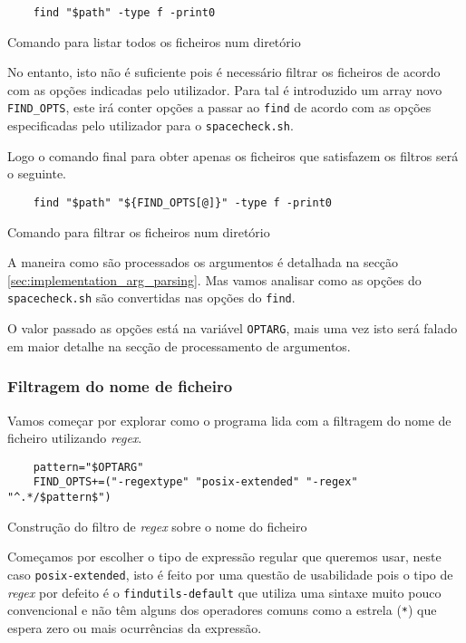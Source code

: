 \begin{listing}[H]
	\centering
	\begin{verbatim}
    find "$path" -type f -print0
  \end{verbatim}
	\caption{Comando para listar todos os ficheiros num diretório}
\end{listing}

No entanto, isto não é suficiente pois é necessário filtrar os ficheiros de
acordo com as opções indicadas pelo utilizador. Para tal é introduzido um array
novo \Verb|FIND_OPTS|, este irá conter opções a passar ao \Verb|find| de acordo
com as opções especificadas pelo utilizador para o \Verb|spacecheck.sh|.

Logo o comando final para obter apenas os ficheiros que satisfazem os filtros
será o seguinte.

\begin{listing}[H]
	\centering
	\begin{verbatim}
    find "$path" "${FIND_OPTS[@]}" -type f -print0
  \end{verbatim}
	\caption{Comando para filtrar os ficheiros num diretório}
\end{listing}

A maneira como são processados os argumentos é detalhada na secção
\ref{sec:implementation_arg_parsing}. Mas vamos analisar como as opções do
\Verb|spacecheck.sh| são convertidas nas opções do \Verb|find|.

O valor passado as opções está na variável \Verb|OPTARG|, mais uma vez isto será
falado em maior detalhe na secção de processamento de argumentos.

\subsubsection{Filtragem do nome de ficheiro}

Vamos começar por explorar como o programa lida com a filtragem do nome de
ficheiro utilizando \emph{regex}.

\begin{listing}[H]
	\centering
	\begin{verbatim}
    pattern="$OPTARG"
    FIND_OPTS+=("-regextype" "posix-extended" "-regex" "^.*/$pattern$")
  \end{verbatim}
	\cprotect\caption{Construção do filtro de \emph{regex} sobre o nome do ficheiro}
\end{listing}

Começamos por escolher o tipo de expressão regular que queremos usar, neste
caso \Verb|posix-extended|, isto é feito por uma questão de usabilidade pois o
tipo de \emph{regex} por defeito é o \Verb|findutils-default| que utiliza uma
sintaxe muito pouco convencional e não têm alguns dos operadores comuns
\cite{find_man} como a estrela (\Verb|*|) que espera zero ou mais ocurrências
da expressão.

